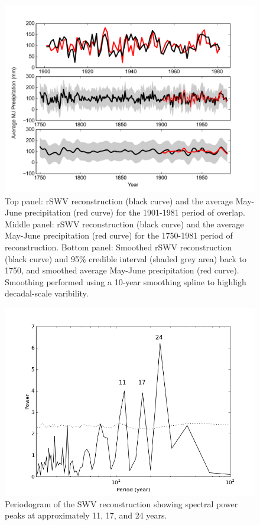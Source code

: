 \begin{figure}
\centering
\includegraphics[width=5in]{figures/reconsmoothed.png}
\caption{Top panel: rSWV reconstruction (black curve) and the average May-June precipitation (red curve) for the 1901-1981 period of overlap. Middle panel: rSWV reconstruction (black curve) and the average May-June precipitation (red curve) for the 1750-1981 period of reconstruction. Bottom panel: Smoothed rSWV reconstruction (black curve) and 95\% credible interval (shaded grey area) back to 1750, and smoothed average May-June precipitation (red curve). Smoothing performed using a 10-year smoothing spline to highligh decadal-scale varibility.}
\label{fig:precipRecon}
\end{figure}

\begin{figure}
\centering
\includegraphics[width=5in]{figures/spectralRecon.png}
\caption{Periodogram of the SWV reconstruction showing spectral power peaks at approximately 11, 17, and 24 years.}
\label{fig:spectral}
\end{figure}

